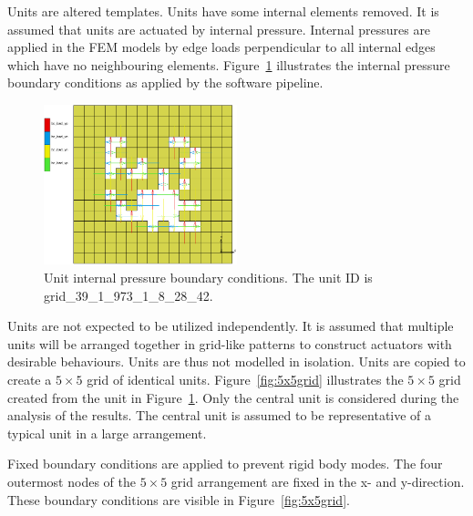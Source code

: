 Units are altered templates. Units have some internal elements removed. It is assumed that units are actuated by internal pressure. Internal pressures are applied in the FEM models by edge loads perpendicular to all internal edges which have no neighbouring elements. Figure~\ref{fig:uip} illustrates the internal pressure boundary conditions as applied by the software pipeline.

\begin{figure}[ht]
	\centering
	\includegraphics[width=0.5\textwidth]{5x5Single.png}
	\caption[Unit internal pressure boundary conditions]{Unit internal pressure boundary conditions. The unit ID is grid\_39\_1\_973\_1\_8\_28\_42.}
	\label{fig:uip}
\end{figure}

Units are not expected to be utilized independently. It is assumed that multiple units will be arranged together in grid-like patterns to construct actuators with desirable behaviours. Units are thus not modelled in isolation. Units are copied to create a $5\times 5$ grid of identical units. Figure~\ref{fig:5x5grid} illustrates the $5\times 5$ grid created from the unit in Figure~\ref{fig:uip}. Only the central unit is considered during the analysis of the results. The central unit is assumed to be representative of a typical unit in a large arrangement.

Fixed boundary conditions are applied to prevent rigid body modes. The four outermost nodes of the $5\times 5$ grid arrangement are fixed in the x- and y-direction. These boundary conditions are visible in Figure~\ref{fig:5x5grid}.

